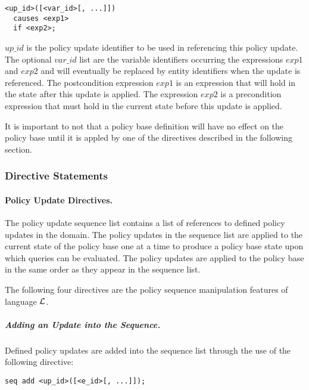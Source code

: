 \documentclass[10pt, twocolumn]{article}
\begin{document}
          \begin{verbatim}
<up_id>([<var_id>[, ...]])
  causes <exp1>
  if <exp2>;
          \end{verbatim}

          $up\_id$ is the policy update identifier to be used in referencing
          this policy update. The optional $var\_id$ list are the variable
          identifiers occurring the expressions $exp1$ and $exp2$ and will
          eventually be replaced by entity identifiers when the update is
          referenced. The postcondition expression $exp1$ is an expression that
          will hold in the state after this update is applied. The expression
          $exp2$ is a precondition expression that must hold in the current
          state before this update is applied.

          It is important to not that a policy base definition will have no
          effect on the policy base until it is appled by one of the directives
          described in the following section.

        \subsubsection{Directive Statements}

        \paragraph{Policy Update Directives.}

        The policy update sequence list contains a list of references to
        defined policy updates in the domain. The policy updates in the
        sequence list are applied to the current state of the policy base one
        at a time to produce a policy base state upon which queries can be
        evaluated. The policy updates are applied to the policy base in the
        same order as they appear in the sequence list.

        The following four directives are the policy sequence manipulation
        features of language $\cal{L}$.

        \subparagraph{Adding an Update into the Sequence.}
          Defined policy updates are added into the sequence list through the
          use of the following directive:

          \begin{verbatim}seq add <up_id>([<e_id>[, ...]]);\end{verbatim}
\end{document}
